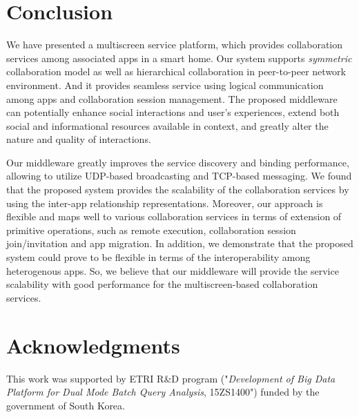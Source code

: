 \documentclass[conference]{IEEEtran}
\begin{document}
\section{Conclusion}
    \label{sc:Conclusion}
We have presented a multiscreen service platform, which provides collaboration services among associated apps in a smart home. 
Our system supports \textit{symmetric} collaboration model as well as hierarchical collaboration in peer-to-peer network environment.
And it provides seamless service using logical communication among apps and collaboration session management.
The proposed middleware can potentially enhance social interactions and user's experiences, extend both social and informational resources available in context, and greatly alter the nature and quality of interactions.

Our middleware greatly improves the service discovery and binding performance, allowing to utilize UDP-based broadcasting and TCP-based messaging.
We found that the proposed system provides the scalability of the collaboration services by using the inter-app relationship representations.
Moreover, our approach is flexible and maps well to various collaboration services in terms of extension of primitive operations, such as remote execution, collaboration session join/invitation and app migration.
In addition, we demonstrate that the proposed system could prove to be flexible in terms of the interoperability among heterogenous apps. 
So, we believe that our middleware will provide the service scalability with good performance for the multiscreen-based collaboration services.

\section*{Acknowledgments}
This work was supported by ETRI R\&D program ("\textit{Development of Big Data Platform for Dual Mode Batch Query Analysis}, 15ZS1400")
funded by the government of South Korea.

%


\end{document}
